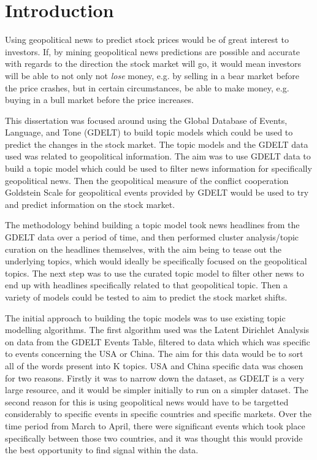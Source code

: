\section{Introduction}
Using geopolitical news to predict stock prices would be of great interest to investors. If, by mining geopolitical news predictions are possible and accurate with regards to the direction the stock market will go, it would mean investors will be able to not only not \textit{lose} money, e.g. by selling in a bear market before the price crashes, but in certain circumstances, be able to make money, e.g. buying in a bull market before the price increases.

This dissertation was focused around using the Global Database of Events, Language, and Tone (GDELT) to build topic models which could be used to predict the changes in the stock market. The topic models and the GDELT data used was related to geopolitical information. The aim was to use GDELT data to build a topic model which could be used to filter news information for specifically geopolitical news. Then the geopolitical measure of the conflict cooperation Goldstein Scale for geopolitical events provided by GDELT would be used to try and predict information on the stock market.

The methodology behind building a topic model took news headlines from the GDELT data over a period of time, and then performed cluster analysis/topic curation on the headlines themselves, with the aim being to tease out the underlying topics, which would ideally be specifically focused on the geopolitical topics. The next step was to use the curated topic model to filter other news to end up with headlines specifically related to that geopolitical topic. Then a variety of models could be tested to aim to predict the stock market shifts.

The initial approach to building the topic models was to use existing topic modelling algorithms. The first algorithm used was the Latent Dirichlet Analysis on data from the GDELT Events Table, filtered to data which which was specific to events concerning the USA or China. The aim for this data would be to sort all of the words present into K topics. USA and China specific data was chosen for two reasons. Firstly it was to narrow down the dataset, as GDELT is a very large resource, and it would be simpler initially to run on a simpler dataset. The second reason for this is using geopolitical news would have to be targetted considerably to specific events in specific countries and specific markets. Over the time period from March to April, there were significant events which took place specifically between those two countries, and it was thought this would provide the best opportunity to find signal within the data. 

